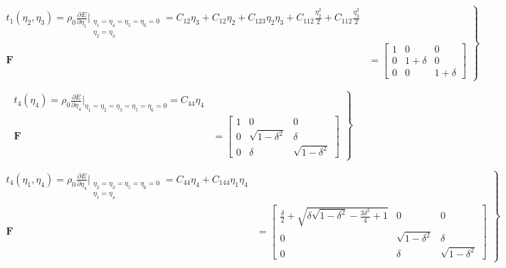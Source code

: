 \documentclass[showpacs,aps,floatfix,prb,reprint,superscriptaddress,onecolumn]{revtex4-1}
\begin{document}
\begin{equation}
\label{eqn:SM-hexs3}
  \left.\begin{aligned}
        t_{1} \left(\eta_{2}, \eta_{3}\right) = \rho_{0} \frac{\partial E}{\partial \eta_{1}}\Bigr|_{\substack{\eta_1=\eta_4=\eta_5=\eta_6=0 \\ \eta_{2}=\eta_{3}}} = C_{12}\eta_{3} + C_{12}\eta_{2} + C_{123}\eta_{2}\eta_{3} + C_{112}\frac{\eta_{2}^{2}}{2} + C_{112}\frac{\eta_{3}^{2}}{2} \\
        \bm{F}&=\begin{bmatrix} 1 & 0 & 0 \\ 0 & 1+\delta & 0 \\ 0 & 0 & 1+\delta \end{bmatrix}
       \end{aligned}
			\right\}
\end{equation}


\begin{equation}
\label{eqn:SM-hexs4}
  \left.\begin{aligned}
        t_{4} \left(\eta_{4}\right) = \rho_{0} \frac{\partial E}{\partial \eta_{4}}\Bigr|_{\eta_1=\eta_2=\eta_3=\eta_5=\eta_6=0} = C_{44}\eta_{4} \\
        \bm{F}&=\begin{bmatrix} 1 & 0 & 0 \\ 0 & \sqrt{1-\delta^2} & \delta \\ 0 & \delta & \sqrt{1-\delta^2} \end{bmatrix}
       \end{aligned}
			\right\}
\end{equation}


\begin{equation}
\label{eqn:SM-hexs5}
  \left.\begin{aligned}
        t_{4} \left(\eta_{1}, \eta_{4}\right) = \rho_{0} \frac{\partial E}{\partial \eta_{4}}\Bigr|_{\substack{\eta_2=\eta_3=\eta_5=\eta_6=0 \\ \eta_{1} = \eta_{4}}} = C_{44}\eta_{4} + C_{144}\eta_{1}\eta_{4} \\
        \bm{F}&=\begin{bmatrix} \frac{\delta}{2}+\sqrt{\delta \sqrt{1-\delta^2}-\frac{3 \delta^2}{4}+1} & 0 & 0 \\ 0 & \sqrt{1-\delta^2} & \delta \\ 0 & \delta & \sqrt{1-\delta^2} \end{bmatrix}
       \end{aligned}
			\right\}
\end{equation}
\end{document}
